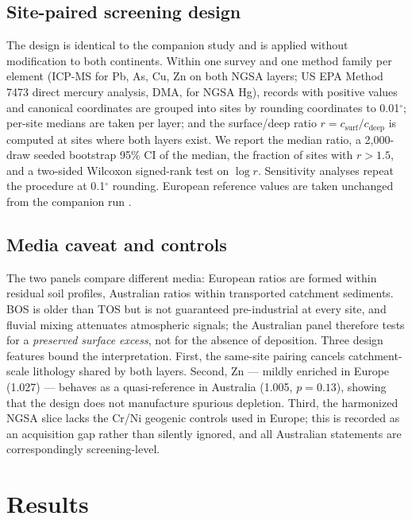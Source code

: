 \documentclass[11pt]{article}
\begin{document}
\subsection{Site-paired screening design}
The design is identical to the companion study and is applied without
modification to both continents. Within one survey and one method family per
element (ICP-MS for Pb, As, Cu, Zn on both NGSA layers; US EPA Method 7473
direct mercury analysis, DMA, for NGSA Hg), records with positive values and
canonical coordinates are grouped into sites by rounding coordinates to
0.01$^{\circ}$; per-site medians are taken per layer; and the surface/deep
ratio $r = c_{\mathrm{surf}}/c_{\mathrm{deep}}$ is computed at sites where
both layers exist. We report the median ratio, a 2{,}000-draw seeded
bootstrap 95\% CI of the median, the fraction of sites with $r > 1.5$, and a
two-sided Wilcoxon signed-rank test on $\log r$. Sensitivity analyses repeat
the procedure at 0.1$^{\circ}$ rounding. European reference values are taken
unchanged from the companion run \cite{gga2026a}.

\subsection{Media caveat and controls}
\label{sec:media}
The two panels compare different media: European ratios are formed within
residual soil profiles, Australian ratios within transported catchment
sediments. BOS is older than TOS but is not guaranteed pre-industrial at
every site, and fluvial mixing attenuates atmospheric signals; the
Australian panel therefore tests for a \emph{preserved surface excess}, not
for the absence of deposition. Three design features bound the
interpretation. First, the same-site pairing cancels catchment-scale
lithology shared by both layers. Second, Zn --- mildly enriched in Europe
(1.027) --- behaves as a quasi-reference in Australia (1.005,
$p{=}0.13$), showing that the design does not manufacture spurious
depletion. Third, the harmonized NGSA slice lacks the Cr/Ni geogenic
controls used in Europe; this is recorded as an acquisition gap rather than
silently ignored, and all Australian statements are correspondingly
screening-level.

\section{Results}
\end{document}
